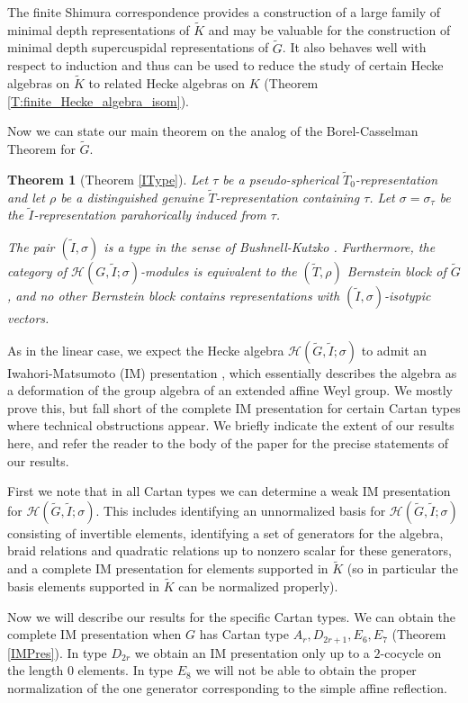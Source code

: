 \documentclass[10pt, letterpaper]{amsart}
\theoremstyle{plain}
\newtheorem{Thm}[equation]{Theorem}
\theoremstyle{definition}
\numberwithin{equation}{section}
\newcommand{\Gt}{\widetilde{G}}
\newcommand{\It}{\widetilde{I}}
\newcommand{\Kt}{\widetilde{K}}
\newcommand{\Tt}{\widetilde{T}}
\newcommand{\Hcal}{\mathcal{H}}
\begin{document}
The finite Shimura correspondence provides a construction of a large family of minimal depth representations of $\Kt$ and may be valuable for the construction of minimal depth supercuspidal representations of $\Gt$. It also behaves well with respect to induction and thus can be used to reduce the study of certain Hecke algebras on $\Kt$ to related Hecke algebras on $K$ (Theorem \ref{T:finite_Hecke_algebra_isom}).

Now we can state our main theorem on the analog of the Borel-Casselman Theorem for $\Gt$.

\begin{Thm}[Theorem \ref{IType}]
Let $\tau$ be a pseudo-spherical $\Tt_{0}$-representation and let $\rho$ be a distinguished genuine $\Tt$-representation containing $\tau$. Let $\sigma=\sigma_{\tau}$ be the $\It$-representation parahorically induced from $\tau$.

The pair $(\It, \sigma)$ is a type in the sense of Bushnell-Kutzko \cite[(4.1) Definition]{BK98}. Furthermore, the category of $\Hcal(G, \It; \sigma)$-modules is equivalent to the $(\Tt, \rho)$ Bernstein block of $\Gt$, and no other Bernstein block contains representations with $(\It,\sigma)$-isotypic vectors.
\end{Thm}

As in the linear case, we expect the Hecke algebra $\Hcal(\Gt, \It; \sigma)$ to admit an Iwahori-Matsumoto (IM) presentation \cite{IM}, which essentially describes the algebra as a deformation of the group algebra of an extended affine Weyl group. We mostly prove this, but fall short of the complete IM presentation for certain Cartan types where technical obstructions appear. We briefly indicate the extent of our results here, and refer the reader to the body of the paper for the precise statements of our results. 

First we note that in all Cartan types we can determine a weak IM presentation for $\Hcal(\Gt, \It; \sigma)$. This includes identifying an unnormalized basis for $\Hcal(\Gt, \It; \sigma)$ consisting of invertible elements, identifying a set of generators for the algebra, braid relations and quadratic relations up to nonzero scalar for these generators, and a complete IM presentation for elements supported in $\Kt$ (so in particular the basis elements supported in $\Kt$ can be normalized properly). 

Now we will describe our results for the specific Cartan types. We can obtain the complete IM presentation when $G$ has Cartan type $A_r,D_{2r+1},E_{6},E_{7}$ (Theorem \ref{IMPres}). In type $D_{2r}$ we obtain an IM presentation only up to a $2$-cocycle on the length $0$ elements. In type $E_{8}$ we will not be able to obtain the proper normalization of the one generator corresponding to the simple affine reflection.
\end{document}
